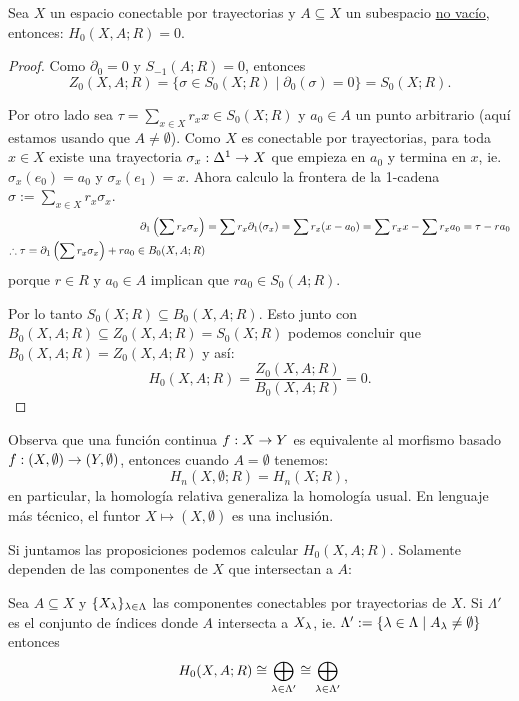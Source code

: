 \documentclass[../../topologia_algebraica]{subfiles}
\begin{document}
\begin{prop}
  Sea $X$ un espacio conectable por trayectorias y $A\subseteq X$ un subespacio
  \underline{no vac\'io}, entonces: $H_0(X,A;R)=0$.
\end{prop}
\begin{proof}
  Como $\partial_0=0$ y $S_{-1}(A;R)=0$, entonces
  \[
    Z_0(X,A;R)=\{\sigma\in S_0(X;R) \mid \partial_0(\sigma)=0\}=S_0(X;R).
  \]
  
  Por otro lado sea $\tau=\sum_{x\in X}r_x x\in S_0(X;R)$ y $a_0\in A$ un punto arbitrario
  (aqu\'i estamos usando que $A\neq\emptyset$). Como $X$ es conectable por trayectorias,
  para toda $x\in X$ existe una trayectoria $\sigma_x:\Delta^1\rightarrow X$ que empieza en $a_0$
  y termina en $x$, ie. $\sigma_x(e_0)=a_0$ y $\sigma_x(e_1)=x$. Ahora calculo la frontera
  de la 1-cadena $\sigma:=\sum_{x\in X}r_x \sigma_x$.
  \begin{align*}
    \partial_1\left( \sum r_x\sigma_x \right)&=
    \sum r_x \partial_1(\sigma_x)=\sum r_x (x-a_0)=\sum r_x x- \sum r_x a_0=\tau-r a_0\\
    \therefore \tau = \partial_1\left( \sum r_x\sigma_x \right)+r a_0 \in B_0(X,A;R)
  \end{align*}
  porque $r\in R$ y $a_0\in A$ implican que $r a_0\in S_0(A;R)$.
  
  Por lo tanto $S_0(X;R)\subseteq B_0(X,A;R)$. Esto junto con $B_0(X,A;R)\subseteq Z_0(X,A;R)=S_0(X;R)$
  podemos concluir que $B_0(X,A;R)=Z_0(X,A;R)$ y as\'i:
  \[
    H_0(X,A;R)=\frac{Z_0(X,A;R)}{B_0(X,A;R)}=0.
  \]
\end{proof}

\begin{nota}
  Observa que una funci\'on continua $f:X\rightarrow Y$ es equivalente al morfismo basado
  $f:(X,\emptyset)\rightarrow(Y,\emptyset)$, entonces cuando $A=\emptyset$ tenemos:
  \[
    H_n(X,\emptyset;R)=H_n(X;R),
  \]
  en particular, la homolog\'ia relativa generaliza la homolog\'ia usual. En lenguaje m\'as
  t\'ecnico, el funtor $X\mapsto (X,\emptyset)$ es una inclusi\'on.
\end{nota}

Si juntamos las proposiciones podemos calcular $H_0(X,A;R)$. Solamente dependen de las componentes de
$X$ que intersectan a $A$:

\begin{cor}
  Sea $A\subseteq X$ y $\{X_{\lambda}\}_{\lambda\in\Lambda}$ las componentes conectables por trayectorias de $X$.
  Si $\Lambda'$ es el conjunto de \'indices donde $A$ intersecta a $X_{\lambda}$, ie.
  $\Lambda':=\{\lambda\in\Lambda\mid A_{\lambda}\neq \emptyset\}$ entonces
  \[
    H_0(X,A;R) \cong \bigoplus_{\lambda\in\Lambda'} \cong \bigoplus_{\lambda\in\Lambda'}
  \]
\end{cor}
\end{document}

